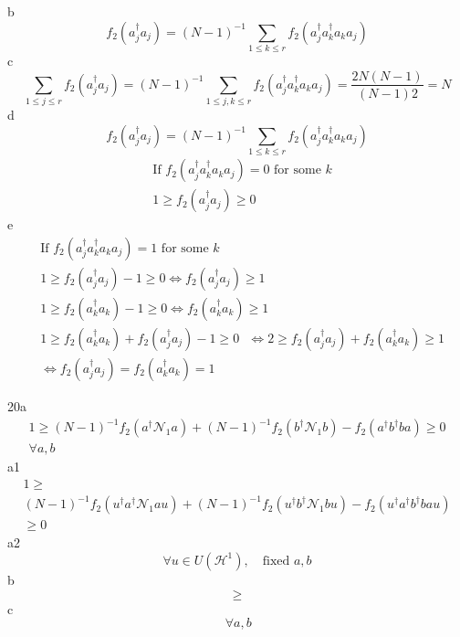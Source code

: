 \documentclass[aps,preprint]{revtex4}%
\begin{document}
b
\[
f_{2}\left(  a_{j}^{\dagger}a_{j}\right)  =\left(  N-1\right)  ^{-1}%
\sum_{1\leq k\leq r}f_{2}\left(  a_{j}^{\dagger}a_{k}^{\dagger}a_{k}%
a_{j}\right)
\]
c%
\[
\sum_{1\leq j\leq r}f_{2}\left(  a_{j}^{\dagger}a_{j}\right)  =\left(
N-1\right)  ^{-1}\sum_{1\leq j,k\leq r}f_{2}\left(  a_{j}^{\dagger}%
a_{k}^{\dagger}a_{k}a_{j}\right)  =\frac{2N\left(  N-1\right)  }{\left(
N-1\right)  2}=N
\]
d%
\[
f_{2}\left(  a_{j}^{\dagger}a_{j}\right)  =\left(  N-1\right)  ^{-1}%
\sum_{1\leq k\leq r}f_{2}\left(  a_{j}^{\dagger}a_{k}^{\dagger}a_{k}%
a_{j}\right)
\]%
\begin{align*}
& \text{If }f_{2}\left(  a_{j}^{\dagger}a_{k}^{\dagger}a_{k}a_{j}\right)
=0\text{ for some }k\\
& 1\geq f_{2}\left(  a_{j}^{\dagger}a_{j}\right)  \geq0\,
\end{align*}
e%
\begin{align*}
& \text{If }f_{2}\left(  a_{j}^{\dagger}a_{k}^{\dagger}a_{k}a_{j}\right)
=1\text{ for some }k\\
& 1\geq f_{2}\left(  a_{j}^{\dagger}a_{j}\right)  -1\geq0\Leftrightarrow
f_{2}\left(  a_{j}^{\dagger}a_{j}\right)  \geq1\\
& 1\geq f_{2}\left(  a_{k}^{\dagger}a_{k}\right)  -1\geq0\Leftrightarrow
f_{2}\left(  a_{k}^{\dagger}a_{k}\right)  \geq1\\
& 1\geq f_{2}\left(  a_{k}^{\dagger}a_{k}\right)  +f_{2}\left(  a_{j}%
^{\dagger}a_{j}\right)  -1\geq0\,\,\,\,\Leftrightarrow2\geq f_{2}\left(
a_{j}^{\dagger}a_{j}\right)  +f_{2}\left(  a_{k}^{\dagger}a_{k}\right)
\geq1\\
& \Leftrightarrow f_{2}\left(  a_{j}^{\dagger}a_{j}\right)  =f_{2}\left(
a_{k}^{\dagger}a_{k}\right)  =1
\end{align*}


20a%
\begin{gather*}
1\geq\left(  N-1\right)  ^{-1}f_{2}\left(  a^{\dagger}\mathcal{N}_{1}a\right)
+\left(  N-1\right)  ^{-1}f_{2}\left(  b^{\dagger}\mathcal{N}_{1}b\right)
-f_{2}\left(  a^{\dagger}b^{\dagger}ba\right)  \geq0\\
\forall a,b
\end{gather*}
a1%
\begin{multline*}
1\geq\\
\left(  N-1\right)  ^{-1}f_{2}\left(  u^{\dagger}a^{\dagger}\mathcal{N}%
_{1}au\right)  +\left(  N-1\right)  ^{-1}f_{2}\left(  u^{\dagger}b^{\dagger
}\mathcal{N}_{1}bu\right)  -f_{2}\left(  u^{\dagger}a^{\dagger}b^{\dagger
}bau\right) \\
\geq0
\end{multline*}
a2%
\[
\forall u\in U\left(  \mathcal{H}^{1}\right)  ,\quad\text{fixed }a,b
\]
b%
\[
\geq
\]
c%
\[
\,\forall a,b
\]
\end{document}
